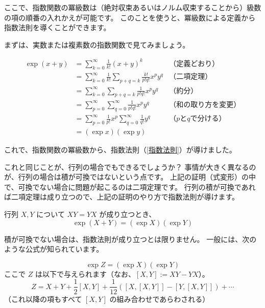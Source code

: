 \documentclass[a5paper]{ltjsarticle}
\begin{document}
ここで、指数関数の冪級数は（絶対収束あるいはノルム収束することから）級数の項の順番の入れかえが可能です。
このことを使うと、冪級数による定義から指数法則を導くことができます。

まずは、実数または複素数の指数関数で見てみましょう。

\begin{align*}
    \exp (x+y) & = \sum_{k=0}^{\infty} \frac{1}{k!} {(x+y)}^k                                & \text{（定義どおり）}           \\
               & = \sum_{k=0}^{\infty} \frac{1}{k!} \sum_{p+q=k} \frac{k!}{p!q!} x^p y^q     & \text{（二項定理）}             \\
               & = \sum_{k=0}^{\infty} \sum_{p+q=k} \frac{1}{p!q!} x^p y^q                   & \text{（約分）}                 \\
               & = \sum_{p=0}^{\infty} \sum_{q=0}^{\infty} \frac{1}{p!q!} x^p y^q            & \text{（和の取り方を変更）}     \\
               & = \sum_{p=0}^{\infty} \frac{1}{p!} x^p \sum_{q=0}^{\infty} \frac{1}{q!} y^q & \text{（\(p\)と\(q\)で分ける）} \\
               & = (\exp x) (\exp y)
\end{align*}

これで、指数関数の冪級数から、指数法則（\autoref{指数法則}）が導けました。

これと同じことが、行列の場合でもできるでしょうか？ 事情が大きく異なるのが、行列の場合は積が可換ではないという点です。
上記の証明（式変形）の中で、可換でない場合に問題が起こるのは二項定理です。
行列の積が可換であれば二項定理は成り立つので、上記の証明のやり方で指数法則が導けます。

\begin{usmproposition}[行列の指数法則]\label{行列の指数法則}
    行列 \(X, Y\) について \(XY = YX\) が成り立つとき、
    \[
        \exp(X + Y) = (\exp X) (\exp Y)
    \]
\end{usmproposition}

積が可換でない場合は、指数法則が成り立つとは限りません。
一般には、次のような公式が知られています。

\begin{usmproposition}\label{Baker-Campbell-Hausdorff}
    \[
        \exp Z = (\exp X) (\exp Y)
    \]
    ここで \(Z\) は以下で与えられます（なお、\([X,Y] := XY - YX\)）。
    \[
        Z = X + Y + \frac{1}{2} [X,Y] + \frac{1}{12} ([X,[X,Y]]-[Y,[X,Y]]) + \cdots
    \]
    （これ以降の項もすべて \([X,Y]\) の組み合わせであらわされる）
\end{usmproposition}
\end{document}
